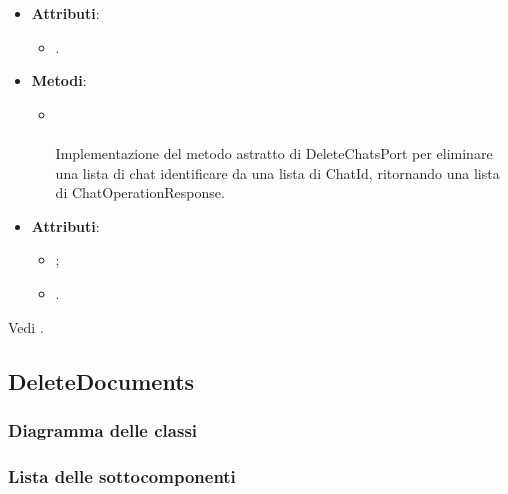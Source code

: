 \documentclass[10pt, a4paper]{article}
\begin{document}
\label{DeleteChatsPostgresDettaglio}
\begin{itemize}
    \item \textbf{Attributi}:
    \begin{itemize}
        \item {}.
    \end{itemize}
    \item \textbf{Metodi}:
    \begin{itemize}
        \item {}\\ \\
        Implementazione del metodo astratto di DeleteChatsPort per eliminare una lista di chat identificare da una lista di ChatId, ritornando una lista di ChatOperationResponse.
    \end{itemize}
\end{itemize}

\label{ChatOperationResponseDettaglio}
\begin{itemize}
    \item \textbf{Attributi}:
    \begin{itemize}
        \item {};
        \item {}.
    \end{itemize}
\end{itemize}

Vedi .


\subsection{DeleteDocuments}
\subsubsection{Diagramma delle classi}
\subsubsection{Lista delle sottocomponenti}
\end{document}
